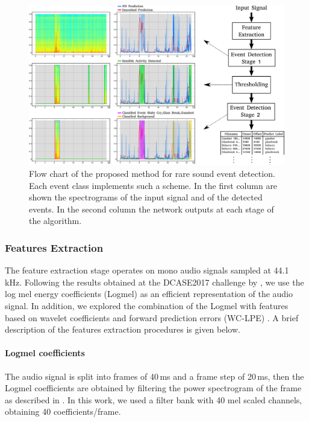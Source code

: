 \begin{figure}[t]
	\centering
	\includegraphics[width=0.9\columnwidth]{img/approccio_finale_1.png}
	\caption[Proposed Approach for Rare Sound Event Detection]{Flow chart of the proposed method for rare sound event detection. Each event class implements such a scheme. In the first column are shown the spectrograms of the input signal and of the detected events. In the second column the network outputs at each stage of the algorithm.}
	\label{fig:flow-chart-rare-sed}
\end{figure}

\subsubsection{Features Extraction}
The feature extraction stage operates on mono audio signals sampled at 44.1 kHz. 
Following the results obtained at the DCASE2017 challenge by \cite{cakirconvolutional}, we use the log mel energy coefficients (Logmel) as an efficient representation of the audio signal. In addition, we explored the combination of the Logmel with features based on wavelet coefficients and forward prediction errors (WC-LPE) \cite{marchi2014multi}. A brief description of the features extraction procedures is given below.
\paragraph{Logmel coefficients}
The audio signal is split into frames of 40\,ms and a frame step of 20\,ms, then the Logmel coefficients are obtained by filtering the power spectrogram of the frame as described in . In this work, we used a filter bank with 40 mel scaled channels, obtaining 40 coefficients/frame. 

